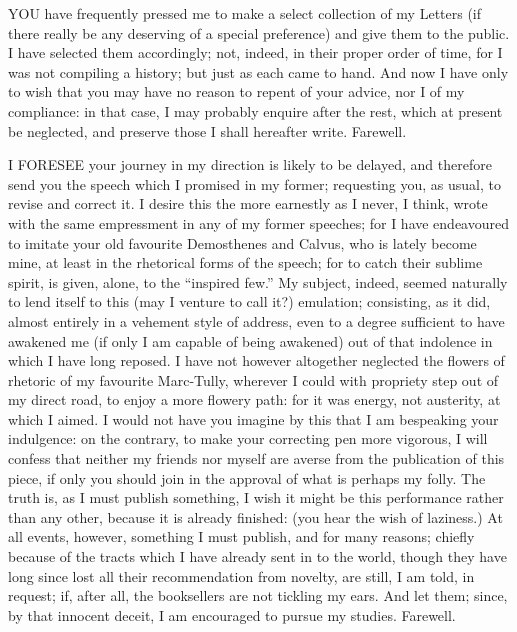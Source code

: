 

YOU have frequently pressed me to make a select collection of my Letters
(if there really be any deserving of a special preference) and give them
to the public. I have selected them accordingly; not, indeed, in their
proper order of time, for I was not compiling a history; but just as each
came to hand. And now I have only to wish that you may have no reason to
repent of your advice, nor I of my compliance: in that case, I may
probably enquire after the rest, which at present be neglected, and
preserve those I shall hereafter write. Farewell.


I FORESEE your journey in my direction is likely to be delayed, and
therefore send you the speech which I promised in my former; requesting
you, as usual, to revise and correct it. I desire this the more earnestly
as I never, I think, wrote with the same empressment in any of my former
speeches; for I have endeavoured to imitate your old favourite Demosthenes
and Calvus, who is lately become mine, at least in the rhetorical forms of
the speech; for to catch their sublime spirit, is given, alone, to the
``inspired few.'' My subject, indeed, seemed naturally to lend itself to
this (may I venture to call it?) emulation; consisting, as it did, almost
entirely in a vehement style of address, even to a degree sufficient to
have awakened me (if only I am capable of being awakened) out of that
indolence in which I have long reposed. I have not however altogether
neglected the flowers of rhetoric of my favourite Marc-Tully, wherever I
could with propriety step out of my direct road, to enjoy a more flowery
path: for it was energy, not austerity, at which I aimed. I would not have
you imagine by this that I am bespeaking your indulgence: on the contrary,
to make your correcting pen more vigorous, I will confess that neither my
friends nor myself are averse from the publication of this piece, if only
you should join in the approval of what is perhaps my folly. The truth is,
as I must publish something, I wish it might be this performance rather
than any other, because it is already finished: (you hear the wish of
laziness.) At all events, however, something I must publish, and for many
reasons; chiefly because of the tracts which I have already sent in to the
world, though they have long since lost all their recommendation from
novelty, are still, I am told, in request; if, after all, the booksellers
are not tickling my ears. And let them; since, by that innocent deceit, I
am encouraged to pursue my studies. Farewell.

